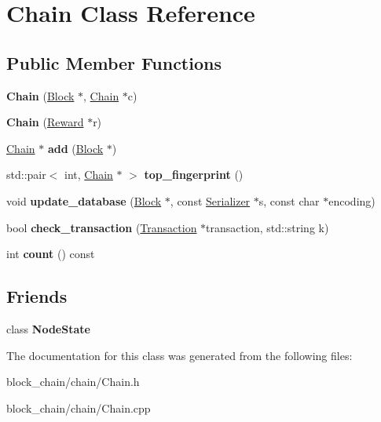 \hypertarget{classChain}{}\section{Chain Class Reference}
\label{classChain}
\subsection*{Public Member Functions}
\begin{DoxyCompactItemize}
\item 
\mbox{\label{classChain_a851466afd0f86ef862ce36dd287546bf}} 
{\bfseries Chain} (\mbox{\hyperlink{classBlock}{Block}} $\ast$, \mbox{\hyperlink{classChain}{Chain}} $\ast$c)
\item 
\mbox{\label{classChain_a6779b5168023552f943c54baed7e7cd4}} 
{\bfseries Chain} (\mbox{\hyperlink{classReward}{Reward}} $\ast$r)
\item 
\mbox{\label{classChain_a7a271a75a12aeae52a2645dcaa14549c}} 
\mbox{\hyperlink{classChain}{Chain}} $\ast$ {\bfseries add} (\mbox{\hyperlink{classBlock}{Block}} $\ast$)
\item 
\mbox{\label{classChain_a5ee2e1efbfe8d2896b0ac836fb750362}} 
std\+::pair$<$ int, \mbox{\hyperlink{classChain}{Chain}} $\ast$ $>$ {\bfseries top\+\_\+fingerprint} ()
\item 
\mbox{\label{classChain_abeec0de116c442e6da59230a85a56724}} 
void {\bfseries update\+\_\+database} (\mbox{\hyperlink{classBlock}{Block}} $\ast$, const \mbox{\hyperlink{classSerializer}{Serializer}} $\ast$s, const char $\ast$encoding)
\item 
\mbox{\label{classChain_a5725ffa89b1f0333536238951d9acd91}} 
bool {\bfseries check\+\_\+transaction} (\mbox{\hyperlink{classTransaction}{Transaction}} $\ast$transaction, std\+::string k)
\item 
\mbox{\label{classChain_ad06a7e312123831339b614a74ff5c9e0}} 
int {\bfseries count} () const
\end{DoxyCompactItemize}
\subsection*{Friends}
\begin{DoxyCompactItemize}
\item 
\mbox{\label{classChain_adfdd1242f00ef4da9a9a01d996fc292c}} 
class {\bfseries Node\+State}
\end{DoxyCompactItemize}


The documentation for this class was generated from the following files\+:\begin{DoxyCompactItemize}
\item 
block\+\_\+chain/chain/Chain.\+h\item 
block\+\_\+chain/chain/Chain.\+cpp\end{DoxyCompactItemize}
